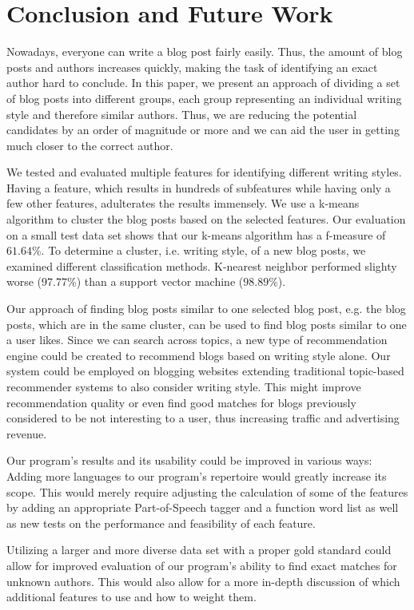 \section{Conclusion and Future Work}
\label{sec:conclusion}


Nowadays, everyone can write a blog post fairly easily.
Thus, the amount of blog posts and authors increases quickly, making the task of identifying an exact author hard to conclude.
In this paper, we present an approach of dividing a set of blog posts into different groups, each group representing an individual writing style and therefore similar authors.
Thus, we are reducing the potential candidates by an order of magnitude or more and we can aid the user in getting much closer to the correct author.


We tested and evaluated multiple features for identifying different writing styles.
Having a feature, which results in hundreds of subfeatures while having only a few other features, adulterates the results immensely.
We use a k-means algorithm to cluster the blog posts based on the selected features.
Our evaluation on a small test data set shows that our k-means algorithm has a f-measure of $61.64\%$.
To determine a cluster, i.e. writing style, of a new blog posts, we examined different classification methods.
K-nearest neighbor performed slighty worse ($97.77\%$) than a support vector machine ($98.89\%$).


Our approach of finding blog posts similar to one selected blog post, e.g. the blog posts, which are in the same cluster, can be used to find blog posts similar to one a user likes.
Since we can search across topics, a new type of recommendation engine could be created to recommend blogs based on writing style alone.
Our system could be employed on blogging websites extending traditional topic-based recommender systems to also consider writing style.
This might improve recommendation quality or even find good matches for blogs previously considered to be not interesting to a user, thus increasing traffic and advertising revenue.


Our program's results and its usability could be improved in various ways: Adding more languages to our program’s repertoire would greatly increase its scope.
This would merely require adjusting the calculation of some of the features by adding an appropriate Part-of-Speech tagger and a function word list as well as new tests on the performance and feasibility of each feature.


Utilizing a larger and more diverse data set with a proper gold standard could allow for improved evaluation of our program’s ability to find exact matches for unknown authors.
This would also allow for a more in-depth discussion of which additional features to use and how to weight them.


